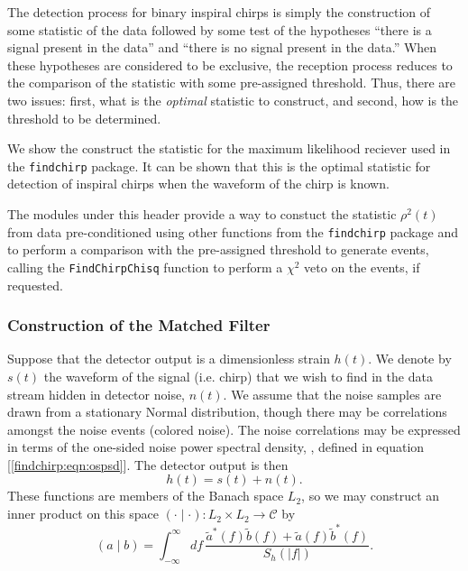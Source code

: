 The detection process for binary inspiral chirps is simply the construction of
some statistic of the data followed by some test of the hypotheses ``there is
a signal present in the data'' and ``there is no signal present in the data.''
When these hypotheses are considered to be exclusive, the reception process
reduces to the comparison of the statistic with some pre-assigned threshold.
Thus, there are two issues: first, what is the \emph{optimal} statistic to
construct, and second, how is the threshold to be determined.

We show the construct the statistic for the maximum likelihood reciever
used in the \texttt{findchirp} package. It can be shown \cite{wz} that this is
the optimal statistic for detection of inspiral chirps when the waveform of
the chirp is known.

The modules under this header provide a way to constuct the statistic
$\rho^2(t)$ from data pre-conditioned using other functions from the
\texttt{findchirp} package and to perform a comparison with the pre-assigned
threshold to generate events, calling the \texttt{FindChirpChisq} function to
perform a $\chi^2$ veto on the events, if requested.

\subsubsection*{Construction of the Matched Filter}

Suppose that the detector output is a dimensionless strain $h(t)$. We denote
by $s(t)$ the waveform of the signal (i.e. chirp) that we wish to find in the
data stream hidden in detector noise, $n(t)$. We assume that the noise samples
are drawn from a stationary Normal distribution, though there may be
correlations amongst the noise events (colored noise). The noise correlations
may be expressed in terms of the one-sided noise power spectral density,
\ospsd, defined in equation [\ref{findchirp:eqn:ospsd}]. The detector output
is then
\begin{equation}
h(t) = s(t) + n(t).
\end{equation}
These functions are members of the Banach space $L_2$, so we may construct an
inner product on this space $(\cdot\mid\cdot) : L_2 \times L_2 \rightarrow
\mathcal{C}$ by
\begin{equation}
  (a\mid b) = \int_{-\infty}^\infty df\,
  \frac{\tilde{a}^\ast(f)\tilde{b}(f)+\tilde{a}(f)\tilde{b}^\ast(f)}
       {S_h(|f|)}.
\end{equation}

